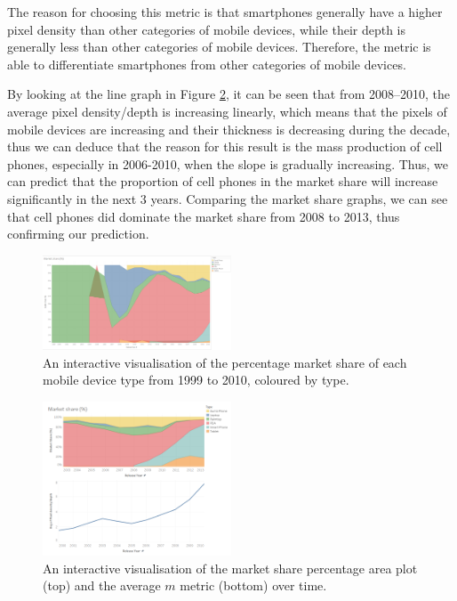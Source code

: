 \documentclass[conference]{IEEEtran}
\begin{document}
The reason for choosing this metric is that smartphones generally have a higher pixel density than other categories of mobile devices, while their depth is generally less than other categories of mobile devices. Therefore, the metric is able to differentiate smartphones from other categories of mobile devices.

By looking at the line graph in Figure \ref{fig:pixel}, it can be seen that from 2008--2010, the average pixel density/depth is increasing linearly, which means that the pixels of mobile devices are increasing and their thickness is decreasing during the decade, thus we can deduce that the reason for this result is the mass production of cell phones, especially in 2006-2010, when the slope is gradually increasing. Thus, we can predict that the proportion of cell phones in the market share will increase significantly in the next 3 years. Comparing the market share graphs, we can see that cell phones did dominate the market share from 2008 to 2013, thus confirming our prediction.

\begin{figure}
    \centering
    \includegraphics[width=0.5\textwidth]{../Visualisations/C/Market share 2010.png}
    \caption{An interactive visualisation of the percentage market share of each
	mobile device type from 1999 to 2010, coloured by type.}
    \label{fig:market-2010}
\end{figure}

\begin{figure}
    \centering
    \includegraphics[width=0.5\textwidth]{../Visualisations/C/Piexel density.png}
    \caption{An interactive visualisation of the market share percentage
	area plot (top) and the average $m$ metric (bottom) over time.}
    \label{fig:pixel}
\end{figure}
\end{document}
